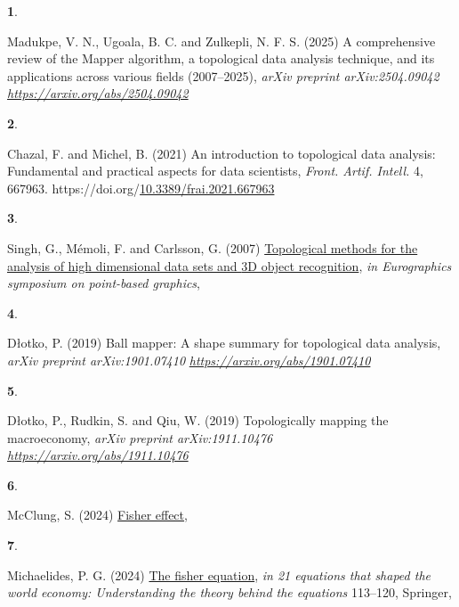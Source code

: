 \documentclass[10pt, letterpaper]{article}
\newlength{\cslhangindent}
\newlength{\csllabelwidth}
\newenvironment{CSLReferences}[2]
  {\begin{list}{}{%
    \setlength{\itemindent}{0pt}
    \setlength{\leftmargin}{0pt}
    \setlength{\parsep}{0pt}
    \ifodd #1
      \setlength{\leftmargin}{\cslhangindent}
      \setlength{\itemindent}{-1\cslhangindent}
    \fi
    \setlength{\itemsep}{#2\baselineskip}}}
  {\end{list}}
\newcommand{\CSLLeftMargin}[1]{\parbox[t]{\csllabelwidth}{\strut#1\strut}}
\newcommand{\CSLRightInline}[1]{\parbox[t]{\linewidth - \csllabelwidth}{\strut#1\strut}}
\begin{document}
\begin{CSLReferences}{1}{0}
\CSLLeftMargin{\textbf{1}. }%
\CSLRightInline{Madukpe, V. N., Ugoala, B. C. and Zulkepli, N. F. S.
(2025) A comprehensive review of the {M}apper algorithm, a topological
data analysis technique, and its applications across various fields
(2007--2025), \emph{arXiv preprint arXiv:2504.09042}
\emph{\url{https://arxiv.org/abs/2504.09042}}}

\CSLLeftMargin{\textbf{2}. }%
\CSLRightInline{Chazal, F. and Michel, B. (2021) An introduction to
topological data analysis: Fundamental and practical aspects for data
scientists, \emph{Front. Artif. Intell.} 4, 667963.
https://doi.org/\href{https://doi.org/10.3389/frai.2021.667963}{10.3389/frai.2021.667963}}

\CSLLeftMargin{\textbf{3}. }%
\CSLRightInline{Singh, G., Mémoli, F. and Carlsson, G. (2007)
\href{https://www.researchgate.net/profile/Facundo-Memoli/publication/221571174_Topological_Methods_for_the_Analysis_of_High_Dimensional_Data_Sets_and_3D_Object_Recognition/links/02bfe50fe76b396b8f000000/Topological-Methods-for-the-Analysis-of-High-Dimensional-Data-Sets-and-3D-Object-Recognition.pdf}{Topological
methods for the analysis of high dimensional data sets and {3D} object
recognition}, \emph{in Eurographics symposium on point-based graphics},
}

\CSLLeftMargin{\textbf{4}. }%
\CSLRightInline{Dłotko, P. (2019) Ball mapper: A shape summary for
topological data analysis, \emph{arXiv preprint arXiv:1901.07410}
\emph{\url{https://arxiv.org/abs/1901.07410}}}

\CSLLeftMargin{\textbf{5}. }%
\CSLRightInline{Dłotko, P., Rudkin, S. and Qiu, W. (2019) Topologically
mapping the macroeconomy, \emph{arXiv preprint arXiv:1911.10476}
\emph{\url{https://arxiv.org/abs/1911.10476}}}

\CSLLeftMargin{\textbf{6}. }%
\CSLRightInline{McClung, S. (2024)
\href{https://inomics.com/terms/fisher-effect-1545486}{Fisher effect}, }

\CSLLeftMargin{\textbf{7}. }%
\CSLRightInline{Michaelides, P. G. (2024)
\href{https://doi.org/10.1007/978-3-031-76140-9_9}{The fisher equation},
\emph{in 21 equations that shaped the world economy: Understanding the
theory behind the equations} 113--120, Springer, }


\end{CSLReferences}
\end{document}
